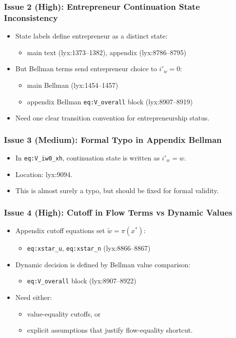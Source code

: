 ﻿\documentclass[english,aspectratio=169]{beamer}
\begin{document}
\begin{frame}
\frametitle{Issue 2 (High): Entrepreneur Continuation State Inconsistency}
\begin{itemize}
\item State labels define entrepreneur as a distinct state:
\begin{itemize}
\item main text (lyx:1373--1382), appendix (lyx:8786--8795)
\end{itemize}
\item But Bellman terms send entrepreneur choice to $i'_w=0$:
\begin{itemize}
\item main Bellman (lyx:1454--1457)
\item appendix Bellman \texttt{eq:V\_overall} block (lyx:8907--8919)
\end{itemize}
\item Need one clear transition convention for entrepreneurship status.
\end{itemize}
\end{frame}

\begin{frame}
\frametitle{Issue 3 (Medium): Formal Typo in Appendix Bellman}
\begin{itemize}
\item In \texttt{eq:V\_iw0\_xh}, continuation state is written as $i'_w=w$.
\item Location: lyx:9094.
\item This is almost surely a typo, but should be fixed for formal validity.
\end{itemize}
\end{frame}

\begin{frame}
\frametitle{Issue 4 (High): Cutoff in Flow Terms vs Dynamic Values}
\begin{itemize}
\item Appendix cutoff equations set $\tilde{w}=\pi(x^*)$:
\begin{itemize}
\item \texttt{eq:xstar\_u}, \texttt{eq:xstar\_n} (lyx:8866--8867)
\end{itemize}
\item Dynamic decision is defined by Bellman value comparison:
\begin{itemize}
\item \texttt{eq:V\_overall} block (lyx:8907--8922)
\end{itemize}
\item Need either:
\begin{itemize}
\item value-equality cutoffs, or
\item explicit assumptions that justify flow-equality shortcut.
\end{itemize}
\end{itemize}
\end{frame}
\end{document}
